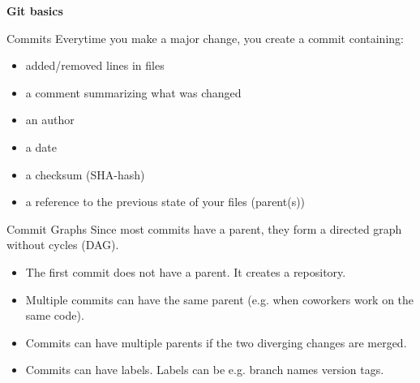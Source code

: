 \documentclass[18pt,mathserif]{beamer}
\begin{document}
\begin{frame}{}
  \begin{center}
    \huge\bfseries
    \textcolor{KITblack}{Git basics}
  \end{center}
\end{frame}

\begin{frame}{Commits}
  Everytime you make a major change, you create a \alert{commit} containing:
  \begin{itemize}
    \item added/removed lines in files
    \item a comment summarizing what was changed
    \item an author
    \item a date
    \item a checksum (SHA-hash)
    \item a reference to the previous state of your files (parent(s))
  \end{itemize}
\end{frame}

\begin{frame}{Commit Graphs}
  Since most commits have a parent, they form a \alert{directed graph} without
  cycles (DAG).

  \begin{itemize}
    \item The first commit does not have a parent. It creates a \alert{repository}.
    \item Multiple commits can have the same parent (e.g. when coworkers work on the same code).
    \item Commits can have multiple parents if the two diverging changes are merged.
    \item Commits can have \alert{labels}. Labels can be e.g. branch names version tags.
  \end{itemize}
\end{frame}
\end{document}
